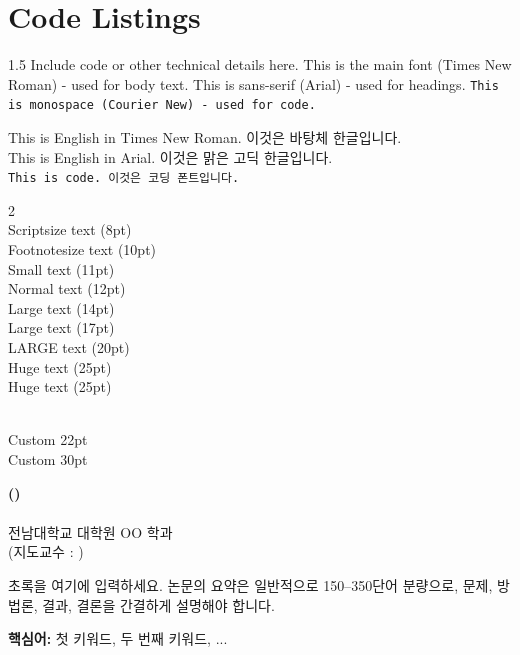 \chapter{Code Listings}
\begin{spacing}{1.5}
    Include code or other technical details here. This is the main font (Times New Roman) - used for body text.
    \textsf{This is sans-serif (Arial) - used for headings.}	
    \texttt{This is monospace (Courier New) - used for code.}\par
    
    \noindent This is English in Times New Roman. 이것은 바탕체 한글입니다.\\
    \textsf{This is English in Arial. 이것은 맑은 고딕 한글입니다.}\\
    \texttt{This is code. 이것은 코딩 폰트입니다.}\par
    
  \begin{spacing}{2}
    \\
    {\scriptsize Scriptsize text (8pt)}\\
    {\footnotesize Footnotesize text (10pt)}\\
    {\small Small text (11pt)}\\
    \normalsize Normal text (12pt)\\
    {\large Large text (14pt)}\\
    {\Large Large text (17pt)}\\
    {\LARGE LARGE text (20pt)}\\
    {\huge Huge text (25pt)}\\
    {\Huge Huge text (25pt)}\par
  \end{spacing}
    
    \\
    {\fontsize{22pt}{26pt}\selectfont Custom 22pt}\\
    {\fontsize{30pt}{36pt}\selectfont Custom 30pt}\par
\end{spacing}

\newpage	
\cleardoublepage
{}
{}
\vspace*{-1.5cm}
\begin{center}
{\LARGE\bfseries (\thesistitleKr)}
\\[3\baselineskip]
{\LARGE {\bfseries \thesisauthor }}
\\[2\baselineskip]
{\large 전남대학교 대학원 OO 학과\\[0.5\baselineskip] (지도교수 : \supervisorKr)}
\\[3\baselineskip]
\end{center}

{\Large {}\par}
초록을 여기에 입력하세요. 논문의 요약은 일반적으로 150--350단어 분량으로, 문제, 방법론, 결과, 결론을 간결하게 설명해야 합니다.

\noindent\textbf{핵심어:} 첫 키워드, 두 번째 키워드, ...